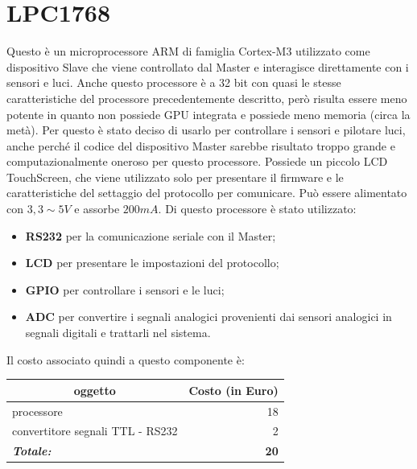 \documentclass[a4paper,titlepage]{book}
\begin{document}
\section{LPC1768}
Questo è un microprocessore ARM di famiglia Cortex-M3 utilizzato come dispositivo Slave che viene controllato dal Master e interagisce direttamente con i sensori e luci. Anche questo processore è a 32 bit con quasi le stesse caratteristiche del processore precedentemente descritto, però risulta essere meno potente in quanto non possiede GPU integrata e possiede meno memoria (circa la metà). Per questo è stato deciso di usarlo per controllare i sensori e pilotare luci, anche perché il codice del dispositivo Master sarebbe risultato troppo grande e computazionalmente oneroso per questo processore. Possiede un piccolo LCD TouchScreen, che viene utilizzato solo per presentare il firmware e le caratteristiche del settaggio del protocollo per comunicare. Può essere alimentato con $3,3 \sim 5 V$ e assorbe $200 mA$. Di questo processore è stato utilizzato:

\begin{itemize}[noitemsep,topsep=10pt,parsep=23pt,partopsep=0pt]
\item \textbf{RS232} per la comunicazione seriale con il Master;
\item \textbf{LCD} per presentare le impostazioni del protocollo;
\item \textbf{GPIO} per controllare i sensori e le luci;
\item \textbf{ADC} per convertire i segnali analogici provenienti dai sensori analogici in segnali digitali e trattarli nel sistema.
\end{itemize}

Il costo associato quindi a questo componente è:

\begin{tabular}{|l  r|}
\hline
\multicolumn{1}{|c|}{\textbf {oggetto}} & \multicolumn{1}{c|}{\textbf {Costo (in Euro)}} \\
\hline

processore 				& 18 \\
convertitore segnali TTL - RS232 	&  2  \\
\hline
\hline

\textit{\textbf{Totale:}}		& \textbf{20} \\

\hline
\end{tabular}
\end{document}
